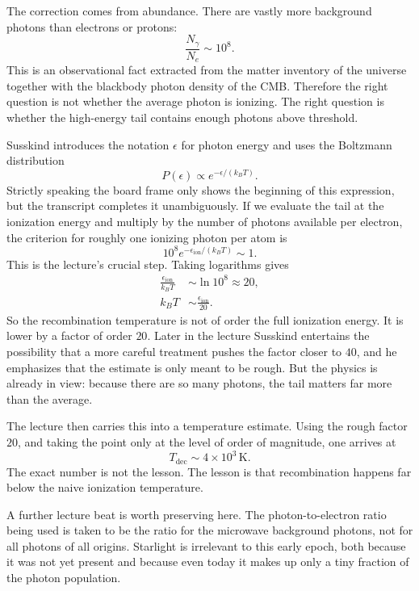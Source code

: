 The correction comes from abundance. There are vastly more background photons than electrons or protons:
\begin{equation}
\frac{N_\gamma}{N_e} \sim 10^8.
\end{equation}
This is an observational fact extracted from the matter inventory of the universe together with the blackbody photon density of the CMB. Therefore the right question is not whether the average photon is ionizing. The right question is whether the high-energy tail contains enough photons above threshold.

Susskind introduces the notation \(\epsilon\) for photon energy and uses the Boltzmann distribution
\begin{equation}
P(\epsilon) \propto e^{-\epsilon/(k_B T)}.
\end{equation}
Strictly speaking the board frame only shows the beginning of this expression, but the transcript completes it unambiguously. If we evaluate the tail at the ionization energy and multiply by the number of photons available per electron, the criterion for roughly one ionizing photon per atom is
\begin{equation}
10^8 e^{-\epsilon_{\mathrm{ion}}/(k_B T)} \sim 1.
\end{equation}
This is the lecture's crucial step. Taking logarithms gives
\begin{align}
\frac{\epsilon_{\mathrm{ion}}}{k_B T}
&\sim \ln 10^8
\approx 20,
\\[4pt]
k_B T
&\sim
\frac{\epsilon_{\mathrm{ion}}}{20}.
\end{align}
So the recombination temperature is not of order the full ionization energy. It is lower by a factor of order \(20\). Later in the lecture Susskind entertains the possibility that a more careful treatment pushes the factor closer to \(40\), and he emphasizes that the estimate is only meant to be rough. But the physics is already in view: because there are so many photons, the tail matters far more than the average.

The lecture then carries this into a temperature estimate. Using the rough factor \(20\), and taking the point only at the level of order of magnitude, one arrives at
\begin{equation}
T_{\mathrm{dec}} \sim 4\times 10^3\,\mathrm{K}.
\end{equation}
The exact number is not the lesson. The lesson is that recombination happens far below the naive ionization temperature.

A further lecture beat is worth preserving here. The photon-to-electron ratio being used is taken to be the ratio for the microwave background photons, not for all photons of all origins. Starlight is irrelevant to this early epoch, both because it was not yet present and because even today it makes up only a tiny fraction of the photon population.

